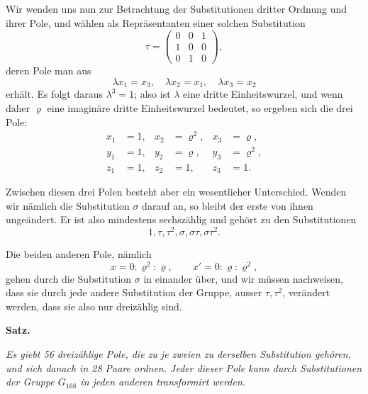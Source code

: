 \documentclass[12pt,a4paper]{article}
\begin{document}
Wir wenden uns nun zur Betrachtung der Substitutionen dritter Ordnung und ihrer Pole, und w\"ahlen als Repr\"asentanten einer solchen Substitution
\[\tau = \begin{pmatrix} 0 & 0 & 1 \\ 1 & 0 & 0 \\ 0 & 1 & 0 \end{pmatrix},\]
deren Pole man aus
\[\lambda x_1 = x_3, \quad \lambda x_2 = x_1, \quad \lambda x_3 = x_2\]
erh\"alt. Es folgt daraus $\lambda^3 = 1$; also ist $\lambda$ eine dritte Einheitswurzel, und wenn daher $\varrho$ eine imagin\"are dritte Einheitswurzel bedeutet, so ergeben sich die drei Pole:
\begin{equation}
\label{eq:dreipole} \begin{aligned} x_1 &= 1, & x_2 &= \varrho^2, & x_3 &= \varrho,\\ y_1 &= 1, & y_2 &= \varrho, & y_3 &= \varrho^2,\\ z_1 &= 1, & z_2 &= 1, & z_3 &= 1. \end{aligned}
\end{equation}

Zwischen diesen drei Polen besteht aber ein wesentlicher Unterschied. Wenden wir n\"amlich die Substitution $\sigma$ darauf an, so bleibt der erste von ihnen unge\"andert. Er ist also mindestens sechsz\"ahlig und geh\"ort zu den Substitutionen
\[1, \tau, \tau^2, \sigma, \sigma\tau, \sigma\tau^2.\]

Die beiden anderen Pole, n\"amlich
\begin{equation}
\label{eq:zweipole} x = 0 : \varrho^2 : \varrho, \qquad x' = 0 : \varrho : \varrho^2,
\end{equation}
gehen durch die Substitution $\sigma$ in einander \"uber, und wir m\"ussen nachweisen, dass sie durch jede andere Substitution der Gruppe, ausser $\tau, \tau^2$, ver\"andert werden, dass sie also nur dreiz\"ahlig sind.

\begin{center}\textbf{Satz.}\end{center}
\textit{Es giebt 56 dreiz\"ahlige Pole, die zu je zweien zu derselben Substitution geh\"oren, und sich danach in 28 Paare ordnen. Jeder dieser Pole kann durch Substitutionen der Gruppe $G_{168}$ in jeden anderen transformirt werden.}
\end{document}
